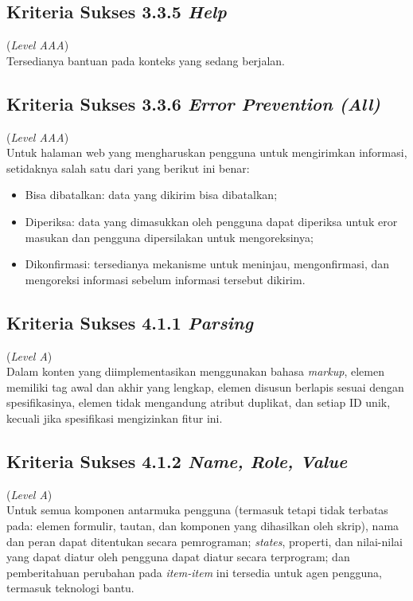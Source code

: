 \subsection{Kriteria Sukses 3.3.5 \textit{Help}}
\label{subsec:kriteria_3.3.5}
(\textit{Level AAA}) \\

Tersedianya bantuan pada konteks yang sedang berjalan.


\subsection{Kriteria Sukses 3.3.6 \textit{Error Prevention (All)}}
\label{subsec:kriteria_3.3.6}
(\textit{Level AAA}) \\

Untuk halaman web yang mengharuskan pengguna untuk mengirimkan informasi, setidaknya salah satu dari yang berikut ini benar:

\begin{itemize}
	\item Bisa dibatalkan: data yang dikirim bisa dibatalkan;
	\item Diperiksa: data yang dimasukkan oleh pengguna dapat diperiksa untuk eror masukan dan pengguna dipersilakan untuk mengoreksinya;
	\item Dikonfirmasi: tersedianya mekanisme untuk meninjau, mengonfirmasi, dan mengoreksi informasi sebelum informasi tersebut dikirim.
\end{itemize}

\subsection{Kriteria Sukses 4.1.1 \textit{Parsing}}
\label{subsec:kriteria_4.1.1}
(\textit{Level A}) \\

Dalam konten yang diimplementasikan menggunakan bahasa \textit{markup}, elemen memiliki tag awal dan akhir yang lengkap, elemen disusun berlapis sesuai dengan spesifikasinya, elemen tidak mengandung atribut duplikat, dan setiap ID unik, kecuali jika spesifikasi mengizinkan fitur ini.

\subsection{Kriteria Sukses 4.1.2 \textit{Name, Role, Value}}
\label{subsec:kriteria_4.1.2}
(\textit{Level A}) \\

Untuk semua komponen antarmuka pengguna (termasuk tetapi tidak terbatas pada: elemen formulir, tautan, dan komponen yang dihasilkan oleh skrip), nama dan peran dapat ditentukan secara pemrograman; \textit{states}, properti, dan nilai-nilai yang dapat diatur oleh pengguna dapat diatur secara terprogram; dan pemberitahuan perubahan pada \textit{item-item} ini tersedia untuk agen pengguna, termasuk teknologi bantu.

